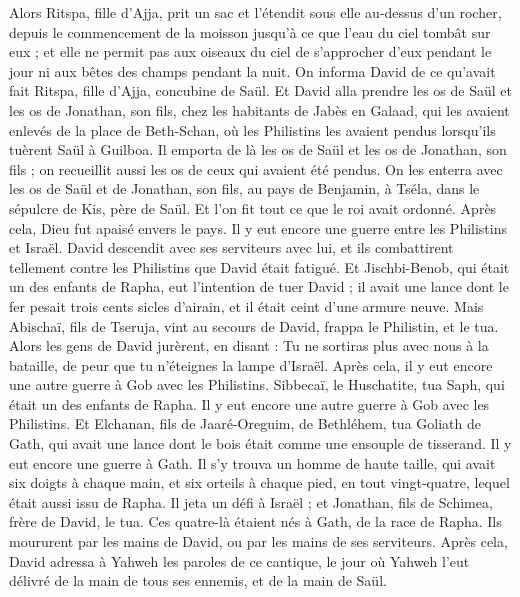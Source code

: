 \begin{multicols}{2}
Alors Ritspa, fille d'Ajja, prit un sac et l’étendit sous elle au-dessus d'un rocher, depuis le commencement de la moisson jusqu'à ce que l'eau du ciel tombât sur eux ; et elle ne permit pas aux oiseaux du ciel de s’approcher d’eux pendant le jour ni aux bêtes des champs pendant la nuit.
On informa David de ce qu’avait fait Ritspa, fille d'Ajja, concubine de Saül.
Et David alla prendre les os de Saül et les os de Jonathan, son fils, chez les habitants de Jabès en Galaad, qui les avaient enlevés de la place de Beth-Schan, où les Philistins les avaient pendus lorsqu'ils tuèrent Saül à Guilboa.
Il emporta de là les os de Saül et les os de Jonathan, son fils ; on recueillit aussi les os de ceux qui avaient été pendus.
On les enterra avec les os de Saül et de Jonathan, son fils, au pays de Benjamin, à Tséla, dans le sépulcre de Kis, père de Saül. Et l’on fit tout ce que le roi avait ordonné. Après cela, Dieu fut apaisé envers le pays.
Il y eut encore une guerre entre les Philistins et Israël. David descendit avec ses serviteurs avec lui, et ils combattirent tellement contre les Philistins que David était fatigué.
Et Jischbi-Benob, qui était un des enfants de Rapha, eut l’intention de tuer David ; il avait une lance dont le fer pesait trois cents sicles d'airain, et il était ceint d'une armure neuve.
Mais Abischaï, fils de Tseruja, vint au secours de David, frappa le Philistin, et le tua. Alors les gens de David jurèrent, en disant : Tu ne sortiras plus avec nous à la bataille, de peur que tu n'éteignes la lampe d'Israël.
Après cela, il y eut encore une autre guerre à Gob avec les Philistins. Sibbecaï, le Huschatite, tua Saph, qui était un des enfants de Rapha.
Il y eut encore une autre guerre à Gob avec les Philistins. Et Elchanan, fils de Jaaré-Oreguim, de Bethléhem, tua Goliath de Gath, qui avait une lance dont le bois était comme une ensouple de tisserand.
Il y eut encore une guerre à Gath. Il s’y trouva un homme de haute taille, qui avait six doigts à chaque main, et six orteils à chaque pied, en tout vingt-quatre, lequel était aussi issu de Rapha.
Il jeta un défi à Israël ; et Jonathan, fils de Schimea, frère de David, le tua.
Ces quatre-là étaient nés à Gath, de la race de Rapha. Ils moururent par les mains de David, ou par les mains de ses serviteurs.
\VerseOne{}Après cela, David adressa à Yahweh les paroles de ce cantique, le jour où Yahweh l'eut délivré de la main de tous ses ennemis, et de la main de Saül.

\end{multicols}
